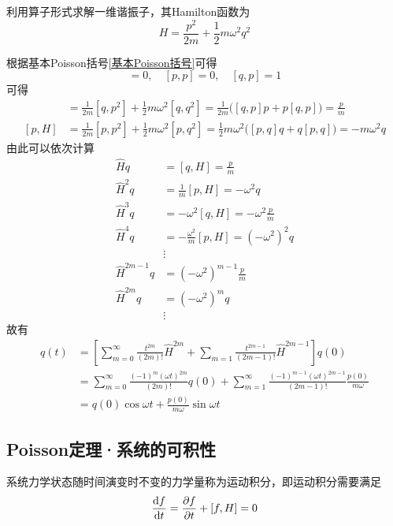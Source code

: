 \begin{example}
利用算子形式求解一维谐振子，其Hamilton函数为
\begin{equation*}
	H = \frac{p^2}{2m} + \frac12 m\omega^2 q^2
\end{equation*}
\end{example}
\begin{solution}
根据基本Poisson括号\eqref{基本Poisson括号}可得
\begin{equation*}
	[q,q] = 0,\quad [p,p] = 0,\quad [q,p] = 1
\end{equation*}
可得
\begin{align*}
	[q,H] & = \frac{1}{2m}[q,p^2] + \frac12 m\omega^2 [q,q^2] = \frac{1}{2m} \bigg([q,p]p+p[q,p]\bigg) = \frac{p}{m} \\
	[p,H] & = \frac{1}{2m}[p,p^2] + \frac12 m\omega^2 [p,q^2] = \frac12 m\omega^2 \bigg([p,q]q+q[p,q]\bigg) = -m\omega^2 q
\end{align*}
由此可以依次计算
\begin{align*}
	\hat{H}q & = [q,H] = \frac{p}{m} \\
	\hat{H}^2q & = \frac{1}{m}[p,H] = -\omega^2 q \\
	\hat{H}^3q & = -\omega^2[q,H] = -\omega^2\frac{p}{m} \\
	\hat{H}^4q & = -\frac{\omega^2}{m}[p,H] = (-\omega^2)^2 q \\
	& \vdots \\
	\hat{H}^{2m-1} q & = (-\omega^2)^{m-1} \frac{p}{m} \\
	\hat{H}^{2m} q & = (-\omega^2)^m q \\
	& \vdots 
\end{align*}
故有
\begin{align*}
	q(t) & = \left[\sum_{m=0}^\infty \frac{t^{2m}}{(2m)!} \hat{H}^{2m} + \sum_{m=1} \frac{t^{2m-1}}{(2m-1)!} \hat{H}^{2m-1}\right] q(0) \\
	& = \sum_{m=0}^\infty \frac{(-1)^m(\omega t)^{2m}}{(2m)!} q(0) + \sum_{m=1}^\infty \frac{(-1)^{m-1}(\omega t)^{2m-1}}{(2m-1)!} \frac{p(0)}{m\omega} \\
	& = q(0) \cos \omega t + \frac{p(0)}{m\omega} \sin \omega t
\end{align*}
\end{solution}

\subsection{Poisson定理·系统的可积性}

系统力学状态随时间演变时不变的力学量称为{\heiti 运动积分}，即运动积分需要满足
\begin{equation}
	\frac{\mathrm{d} f}{\mathrm{d} t} = \frac{\partial f}{\partial t} + [f,H] = 0
\end{equation}

